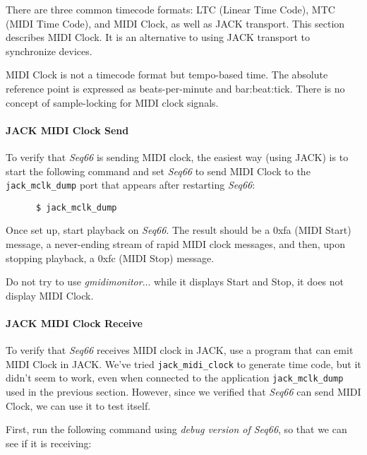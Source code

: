    There are three common timecode formats: LTC (Linear Time Code),
   MTC (MIDI Time Code), and MIDI Clock, as well
   as JACK transport.
   This section describes MIDI Clock.
   It is an alternative to using JACK transport to synchronize devices.

   MIDI Clock is not a timecode format but tempo-based time. The absolute
   reference point is expressed as beats-per-minute and bar:beat:tick.
   There is no concept of sample-locking for MIDI clock signals.

\paragraph{JACK MIDI Clock Send}
\label{paragraph:jack_testing_midi_clock_send}

   To verify that \textsl{Seq66} is sending MIDI clock, the easiest way (using
   JACK) is to start the following command and set \textsl{Seq66} to send
   MIDI Clock to the \texttt{jack\_mclk\_dump} port
   that appears after restarting
   \textsl{Seq66}:

   \begin{verbatim}
      $ jack_mclk_dump
   \end{verbatim}

   Once set up, start playback on \textsl{Seq66}.
   The result should be a 0xfa (MIDI Start) message,
   a never-ending stream of rapid MIDI clock messages,
   and then, upon stopping playback, a 0xfc (MIDI Stop) message.

   Do not try to use \textsl{gmidimonitor}... while it displays Start and Stop,
   it does not display MIDI Clock.

\paragraph{JACK MIDI Clock Receive}
\label{paragraph:jack_testing_midi_clock_receive}

   To verify that \textsl{Seq66} receives MIDI clock in JACK, use a program
   that can emit MIDI Clock in JACK.
   We've tried \texttt{jack\_midi\_clock} to generate time code, but
   it didn't seem to work, even when connected to the
   application \texttt{jack\_mclk\_dump} used in the previous section.
   However, since we verified that \textsl{Seq66} can send MIDI Clock, we can
   use it to test itself.

   First, run the following command using \textsl{debug version of Seq66}, so
   that we can see if it is receiving:

